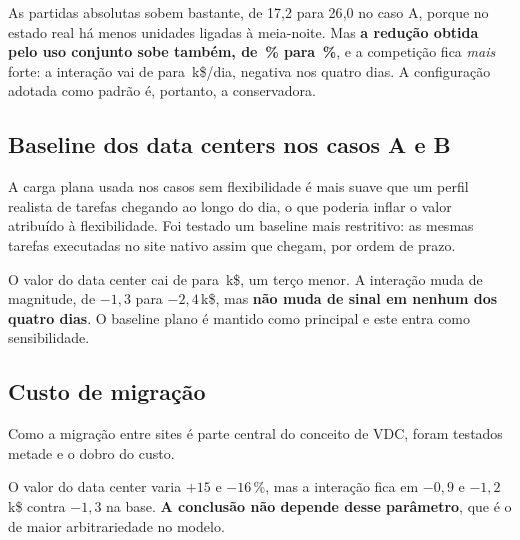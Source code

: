 \documentclass[11pt,a4paper]{article}
\begin{document}
\begin{table}[htbp]
\centering\small
\caption{Regra padrão contra estado herdado do dia anterior.}
\tabcondicoes
\end{table}

As partidas absolutas sobem bastante, de 17{,}2 para 26{,}0 no caso A, porque no estado real há menos
unidades ligadas à meia-noite. Mas \textbf{a redução obtida pelo uso conjunto sobe também, de
\numredsubase{}\,\% para \numredsuhist{}\,\%}, e a competição fica \emph{mais} forte: a interação vai de
\numIbase{} para \numIhist{}\,k\$/dia, negativa nos quatro dias. A configuração adotada como padrão é,
portanto, a conservadora.

\subsection{Baseline dos data centers nos casos A e B}

A carga plana usada nos casos sem flexibilidade é mais suave que um perfil realista de tarefas chegando
ao longo do dia, o que poderia inflar o valor atribuído à flexibilidade. Foi testado um baseline mais restritivo: as
mesmas tarefas executadas no site nativo assim que chegam, por ordem de prazo.

\begin{table}[htbp]
\centering\small
\caption{Baseline plano contra baseline nativo (k\$/dia).}
\tabbaseline
\end{table}

O valor do data center cai de \numdCplano{} para \numdCnativo{}\,k\$, um terço menor. A interação muda de
magnitude, de $-1{,}3$ para $-2{,}4$\,k\$, mas \textbf{não muda de sinal em nenhum dos quatro dias}. O baseline plano é mantido como principal e este entra como sensibilidade.

\subsection{Custo de migração}

Como a migração entre sites é parte central do conceito de VDC, foram testados metade e o dobro do
custo.

\begin{table}[htbp]
\centering\small
\caption{Sensibilidade ao custo de migração (k\$/dia).}
\tabmigracao
\end{table}

O valor do data center varia $+15$ e $-16$\,\%, mas a interação fica em $-0{,}9$ e $-1{,}2$\,k\$ contra
$-1{,}3$ na base. \textbf{A conclusão não depende desse parâmetro}, que é o de maior arbitrariedade no
modelo.
\end{document}
